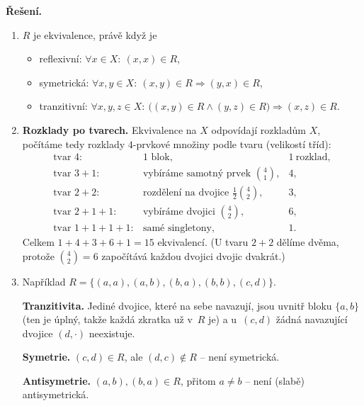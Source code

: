 \documentclass[11pt,a4paper]{article}
\begin{document}
\begin{priklad}
\textbf{Řešení.}
\begin{enumerate}[label=(\arabic*)]
  \item $R$ je ekvivalence, právě když je
    \begin{itemize}
      \item reflexivní: $\forall x\in X:\ (x,x)\in R$,
      \item symetrická: $\forall x,y\in X:\ (x,y)\in R\Rightarrow(y,x)\in R$,
      \item tranzitivní: $\forall x,y,z\in X:\ \big((x,y)\in R\wedge(y,z)\in R\big)\Rightarrow(x,z)\in R$.
    \end{itemize}
  \item \textbf{Rozklady po tvarech.} Ekvivalence na $X$ odpovídají rozkladům $X$, počítáme tedy rozklady $4$-prvkové množiny podle tvaru (velikostí tříd):
    \[
    \begin{array}{lll}
      \text{tvar } 4: & \text{1 blok}, & 1\ \text{rozklad},\\
      \text{tvar } 3+1: & \text{vybíráme samotný prvek } \binom{4}{1}, & 4,\\
      \text{tvar } 2+2: & \text{rozdělení na dvojice } \tfrac12\binom{4}{2}, & 3,\\
      \text{tvar } 2+1+1: & \text{vybíráme dvojici } \binom{4}{2}, & 6,\\
      \text{tvar } 1+1+1+1: & \text{samé singletony}, & 1.
    \end{array}
    \]
    Celkem $1+4+3+6+1=\boxed{15}$ ekvivalencí. (U tvaru $2+2$ dělíme dvěma, protože $\binom42=6$ započítává každou dvojici dvojic dvakrát.)
  \item Například $R=\{(a,a),(a,b),(b,a),(b,b),(c,d)\}$.\par
    \textbf{Tranzitivita.} Jediné dvojice, které na sebe navazují, jsou uvnitř bloku $\{a,b\}$ (ten je úplný, takže každá zkratka už v~$R$ je) a u~$(c,d)$ žádná navazující dvojice $(d,\cdot)$ neexistuje.\par
    \textbf{Symetrie.} $(c,d)\in R$, ale $(d,c)\notin R$ -- není symetrická.\par
    \textbf{Antisymetrie.} $(a,b),(b,a)\in R$, přitom $a\neq b$ -- není (slabě) antisymetrická.
\end{enumerate}
\begin{center}
\end{center}
\end{priklad}
\end{document}
